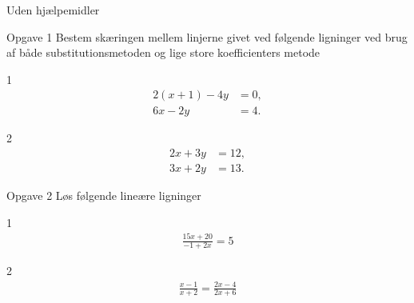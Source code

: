 \begin{center}
	\LARGE
	Uden hjælpemidler
\end{center}
\begin{opgavetekst}{Opgave 1}
	Bestem skæringen mellem linjerne givet ved følgende ligninger ved brug af både substitutionsmetoden og 
	lige store koefficienters metode
\end{opgavetekst}
\begin{delopgave}{}{1}
	\begin{align*}
		2(x + 1) - 4y &= 0,\\
		6x - 2y &= 4.
	\end{align*}	 
\end{delopgave}
\begin{delopgave}{}{2}
	\begin{align*}
		2x + 3y &= 12, \\
		3x + 2y &= 13.
	\end{align*}
\end{delopgave}
\begin{opgavetekst}{Opgave 2}
	Løs følgende lineære ligninger
\end{opgavetekst}
\begin{delopgave}{}{1}
	\begin{align*}
		\frac{15x + 20}{-1 + 2x} = 5
	\end{align*}
\end{delopgave}
\begin{delopgave}{}{2}
	\begin{align*}
		\frac{x-1}{x+2} = \frac{2x-4}{2x+6}
	\end{align*}
\end{delopgave}

\newpage


